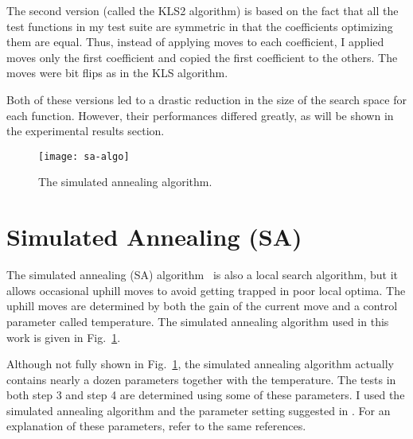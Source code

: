\documentclass{article}
\begin{document}
The second version (called the KLS2 algorithm) is based on the fact
that all the test functions in my test suite are symmetric in that the
coefficients optimizing them are equal. Thus, instead of applying
moves to each coefficient, I applied moves only the first coefficient
and copied the first coefficient to the others. The moves were bit
flips as in the KLS algorithm.

Both of these versions led to a drastic reduction in the size of the
search space for each function. However, their performances differed
greatly, as will be shown in the experimental results section.

\begin{figure}[t]
  \centering
  \texttt{[image: sa-algo]}
  \caption{The simulated annealing algorithm.}
  \label{fig:sa-algo}
\end{figure}

\section{Simulated Annealing (SA)}
\label{sec:sa-algo}

The simulated annealing (SA) algorithm~\cite{JoArMc89,JoArMc91} is
also a local search algorithm, but it allows occasional uphill moves
to avoid getting trapped in poor local optima. The uphill moves are
determined by both the gain of the current move and a control
parameter called temperature. The simulated annealing algorithm used
in this work is given in Fig.~\ref{fig:sa-algo}.

Although not fully shown in Fig.~\ref{fig:sa-algo}, the simulated
annealing algorithm actually contains nearly a dozen parameters
together with the temperature.  The tests in both step 3 and step 4
are determined using some of these parameters. I used the simulated
annealing algorithm and the parameter setting suggested in
\cite{JoArMc89,JoArMc91}. For an explanation of these parameters,
refer to the same references.
\end{document}
